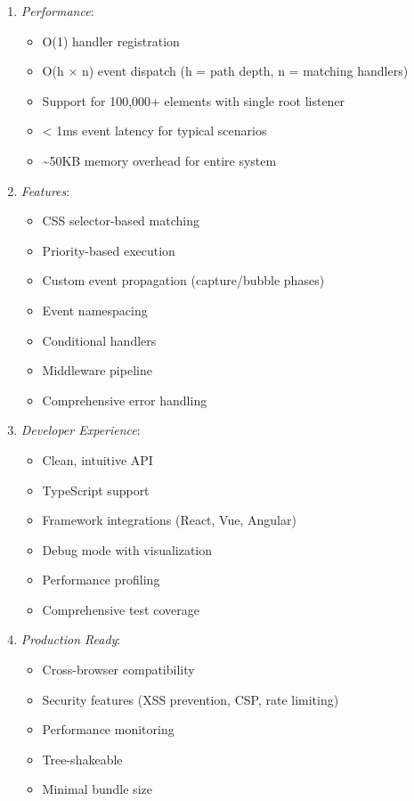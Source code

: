 \documentclass[11pt]{article}
\begin{document}
\begin{enumerate}
\item \emph{Performance}:

\begin{itemize}
\item O(1) handler registration
\item O(h × n) event dispatch (h = path depth, n = matching handlers)
\item Support for 100,000+ elements with single root listener
\item < 1ms event latency for typical scenarios
\item \textasciitilde{}50KB memory overhead for entire system
\end{itemize}

\item \emph{Features}:

\begin{itemize}
\item CSS selector-based matching
\item Priority-based execution
\item Custom event propagation (capture/bubble phases)
\item Event namespacing
\item Conditional handlers
\item Middleware pipeline
\item Comprehensive error handling
\end{itemize}

\item \emph{Developer Experience}:

\begin{itemize}
\item Clean, intuitive API
\item TypeScript support
\item Framework integrations (React, Vue, Angular)
\item Debug mode with visualization
\item Performance profiling
\item Comprehensive test coverage
\end{itemize}

\item \emph{Production Ready}:

\begin{itemize}
\item Cross-browser compatibility
\item Security features (XSS prevention, CSP, rate limiting)
\item Performance monitoring
\item Tree-shakeable
\item Minimal bundle size
\end{itemize}
\end{enumerate}
\end{document}
